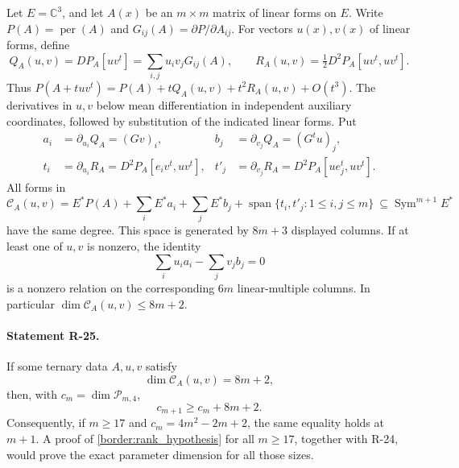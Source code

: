 Let $E=\mathbb C^3$, and let $A(x)$ be an $m\times m$ matrix of
linear forms on $E$. Write $P(A)=\operatorname{per}(A)$ and
$G_{ij}(A)=\partial P/\partial A_{ij}$. For vectors $u(x),v(x)$
of linear forms, define
\[
 Q_A(u,v)=DP_A[uv^t]
          =\sum_{i,j}u_iv_jG_{ij}(A),\qquad
 R_A(u,v)=\tfrac12D^2P_A[uv^t,uv^t].
\]
Thus $P(A+tuv^t)=P(A)+tQ_A(u,v)+t^2R_A(u,v)+O(t^3)$.
The derivatives in $u,v$ below mean differentiation in independent
auxiliary coordinates, followed by substitution of the indicated
linear forms. Put
\begin{align*}
 a_i&=\partial_{u_i}Q_A=(Gv)_i,&
 b_j&=\partial_{v_j}Q_A=(G^tu)_j,\\
 t_i&=\partial_{u_i}R_A
          =D^2P_A[e_iv^t,uv^t],&
 t'_j&=\partial_{v_j}R_A
          =D^2P_A[ue_j^t,uv^t].
\end{align*}
All forms in
\begin{equation}\label{border:C}
 \mathcal C_A(u,v)
 =E^*P(A)
   +\sum_i E^*a_i+\sum_j E^*b_j
   +\operatorname{span}\{t_i,t'_j:1\leq i,j\leq m\}
 \ \subseteq\operatorname{Sym}^{m+1}E^*
\end{equation}
have the same degree. This space is generated by $8m+3$ displayed
columns. If at least one of $u,v$ is nonzero, the identity
\begin{equation}\label{border:scaling_relation}
 \sum_i u_i a_i-\sum_jv_jb_j=0
\end{equation}
is a nonzero relation on the corresponding $6m$ linear-multiple
columns. In particular $\dim\mathcal C_A(u,v)\leq8m+2$.

\paragraph{Statement R-25.}
If some ternary data $A,u,v$ satisfy
\begin{equation}\label{border:rank_hypothesis}
 \dim\mathcal C_A(u,v)=8m+2,
\end{equation}
then, with $c_m=\dim\mathcal P_{m,4}$,
\begin{equation}\label{border:increment}
 c_{m+1}\geq c_m+8m+2.
\end{equation}
Consequently, if $m\geq17$ and $c_m=4m^2-2m+2$, the same
equality holds at $m+1$. A proof of
\eqref{border:rank_hypothesis} for all $m\geq17$, together with
R-24, would prove the exact parameter dimension for all those sizes.

